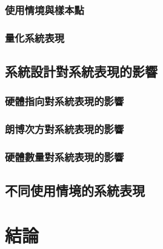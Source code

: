 \subsubsection{使用情境與樣本點}
\subsubsection{量化系統表現}


\subsection{系統設計對系統表現的影響}
\subsubsection{硬體指向對系統表現的影響}
\subsubsection{朗博次方對系統表現的影響}
\subsubsection{硬體數量對系統表現的影響}

\subsection{不同使用情境的系統表現}


\section{結論}
\label{chp:4_conclusion}











